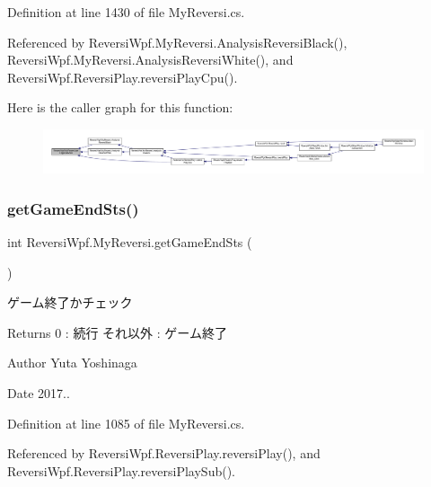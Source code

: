 Definition at line 1430 of file My\+Reversi.\+cs.



Referenced by Reversi\+Wpf.\+My\+Reversi.\+Analysis\+Reversi\+Black(), Reversi\+Wpf.\+My\+Reversi.\+Analysis\+Reversi\+White(), and Reversi\+Wpf.\+Reversi\+Play.\+reversi\+Play\+Cpu().

Here is the caller graph for this function\+:\nopagebreak
\begin{figure}[H]
\begin{center}
\leavevmode
\includegraphics[width=350pt]{class_reversi_wpf_1_1_my_reversi_a3418fce34fd194987dc0efcd7aa654a4_icgraph}
\end{center}
\end{figure}
\mbox{\label{class_reversi_wpf_1_1_my_reversi_a77a81c9c08a6dadcab0dd5741de1b88b}} 
\subsubsection{\texorpdfstring{get\+Game\+End\+Sts()}{getGameEndSts()}}
{\footnotesize\ttfamily int Reversi\+Wpf.\+My\+Reversi.\+get\+Game\+End\+Sts (\begin{DoxyParamCaption}{ }\end{DoxyParamCaption})}



ゲーム終了かチェック 

\begin{DoxyReturn}{Returns}
0 \+: 続行 それ以外 \+: ゲーム終了 
\end{DoxyReturn}
\begin{DoxyAuthor}{Author}
Yuta Yoshinaga 
\end{DoxyAuthor}
\begin{DoxyDate}{Date}
2017.. 
\end{DoxyDate}


Definition at line 1085 of file My\+Reversi.\+cs.



Referenced by Reversi\+Wpf.\+Reversi\+Play.\+reversi\+Play(), and Reversi\+Wpf.\+Reversi\+Play.\+reversi\+Play\+Sub().

